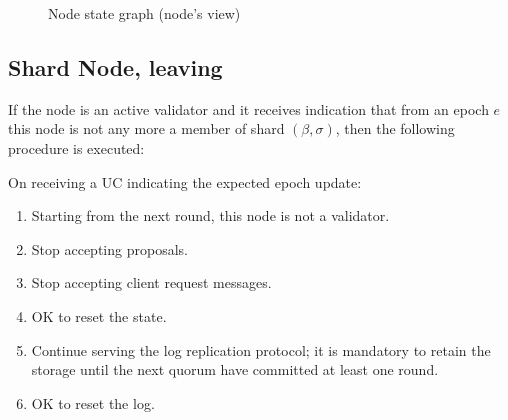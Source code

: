 \begin{figure}[!htbp]
	\begin{center}
    \caption{Node state graph (node's view)}\label{fi:node-state-graph}
  \end{center}
\end{figure}

\subsection{Shard Node, leaving}

If the node is an active validator and it receives indication that from an epoch $e$ this node is not any more a member of shard $(\beta, \sigma)$, then the following procedure is executed:

\begin{shaded}
  On receiving a UC indicating the expected epoch update:
  \begin{enumerate}[nosep]
    \item Starting from the next round, this node is not a validator.
    \item Stop accepting proposals.
    \item Stop accepting client request messages.
    \item OK to reset the state.
    \item Continue serving the log replication protocol; it is mandatory to retain the storage until the next quorum have committed at least one round.
    \item OK to reset the log.
  \end{enumerate}
\end{shaded}

